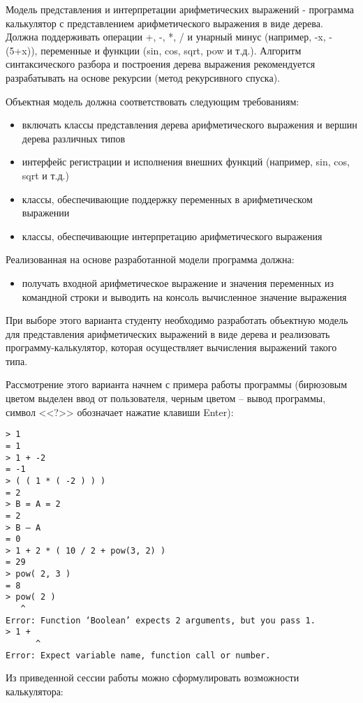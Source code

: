 \documentclass[a4paper,12pt]{article}
\begin{document}
Модель представления и интерпретации арифметических выражений -
программа калькулятор с представлением арифметического выражения в
виде дерева. Должна поддерживать операции +, -, *, / и унарный минус
(например, -x, -(5+x)), переменные и функции (sin, cos, sqrt, pow и
т.д.). Алгоритм синтаксического разбора и построения дерева выражения
рекомендуется разрабатывать на основе рекурсии (метод рекурсивного
спуска).

Объектная модель должна соответствовать следующим требованиям:

\begin{itemize}
\item включать классы представления дерева арифметического выражения и
  вершин дерева различных типов
\item интерфейс регистрации и исполнения внешних функций (например, sin,
  cos, sqrt и т.д.)
\item классы, обеспечивающие поддержку переменных в арифметическом
  выражении
\item классы, обеспечивающие интерпретацию арифметического выражения
\end{itemize}

Реализованная на основе разработанной модели программа должна: 

\begin{itemize}
\item получать входной арифметическое выражение и значения переменных
  из командной строки и выводить на консоль вычисленное значение
  выражения
\end{itemize}

При выборе этого варианта студенту необходимо разработать объектную
модель для представления арифметических выражений в виде дерева и
реализовать программу-калькулятор, которая осуществляет вычисления
выражений такого типа.

Рассмотрение этого варианта начнем с примера работы программы
(бирюзовым цветом выделен ввод от пользователя, черным цветом – вывод
программы, символ <<?>> обозначает нажатие клавиши Enter):

\begin{verbatim}
> 1
= 1
> 1 + -2
= -1
> ( ( 1 * ( -2 ) ) )
= 2
> B = A = 2
= 2
> B – A
= 0
> 1 + 2 * ( 10 / 2 + pow(3, 2) )
= 29
> pow( 2, 3 )
= 8
> pow( 2 )
   ^       
Error: Function ‘Boolean’ expects 2 arguments, but you pass 1.
> 1 +
      ^
Error: Expect variable name, function call or number.
\end{verbatim}

Из приведенной сессии работы можно сформулировать возможности калькулятора:
\end{document}
